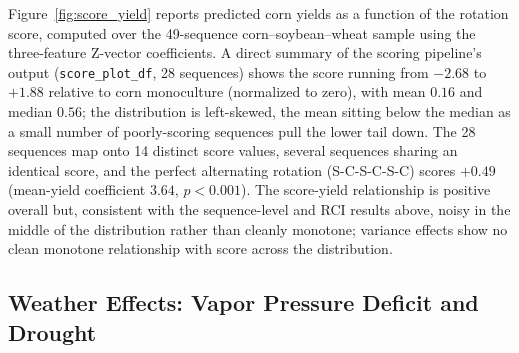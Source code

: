 \documentclass[12pt,letterpaper]{article}
\theoremstyle{remark}
\theoremstyle{remark}
\theoremstyle{plain}
\theoremstyle{definition}
\begin{document}
Figure~\ref{fig:score_yield} reports predicted corn yields as a function of the rotation score, computed over the 49-sequence corn--soybean--wheat sample using the three-feature Z-vector coefficients. A direct summary of the scoring pipeline's output (\texttt{score\_plot\_df}, 28 sequences) shows the score running from $-2.68$ to $+1.88$ relative to corn monoculture (normalized to zero), with mean $0.16$ and median $0.56$; the distribution is left-skewed, the mean sitting below the median as a small number of poorly-scoring sequences pull the lower tail down. The 28 sequences map onto 14 distinct score values, several sequences sharing an identical score, and the perfect alternating rotation (S-C-S-C-S-C) scores $+0.49$ (mean-yield coefficient $3.64$, $p<0.001$). The score-yield relationship is positive overall but, consistent with the sequence-level and RCI results above, noisy in the middle of the distribution rather than cleanly monotone; variance effects show no clean monotone relationship with score across the distribution.

\subsection{\label{subsec:vpd_effects}Weather Effects: Vapor Pressure Deficit and Drought}
\end{document}
